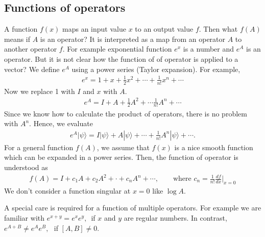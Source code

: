 \documentclass[letterpaper,10pt,english]{jupyterBook}
\begin{document}
\subsection{Functions of operators}
\label{\detokenize{qmsummary/operators:functions-of-operators}}
\sphinxAtStartPar
A function \(f(x)\) maps an input value \(x\) to an output value \(f\).  Then what \(f(A)\) means if \(A\) is an operator? It is interpreted as a map from an operator \(A\) to another operator \(f\).  For example exponential function \(e^x\) is a number and \(e^A\) is an operator. But it is not clear how the function of of operator is applied to a vector?  We define \(e^A\) using a power series (Taylor expansion).  For example,
\begin{equation*}
\begin{split}
e^x = 1 + x + \frac{1}{2}x^2 + \cdots + \frac{1}{n!}x^n + \cdots
\end{split}
\end{equation*}
\sphinxAtStartPar
Now we replace 1 with \(I\) and \(x\) with \(A\).
\begin{equation*}
\begin{split}
e^A = I + A + \frac{1}{2} A^2 + \cdots \frac{1}{n!} A^n + \cdots
\end{split}
\end{equation*}
\sphinxAtStartPar
Since we know how to calculate the product of operators, there is no problem with \(A^n\).  Hence, we evaluate
\begin{equation*}
\begin{split}
e^A |\psi\rangle = I |\psi\rangle + A |\psi\rangle + \cdots + \frac{1}{n!} A^n |\psi\rangle + \cdots.
\end{split}
\end{equation*}
\sphinxAtStartPar
For a general function \(f(A)\), we assume that \(f(x)\) is a nice smooth function which can be expanded in a power series.  Then, the function of operator is understood as
\begin{equation*}
\begin{split}
f(A) = I + c_1 A + c_2 A^2 + \cdot + c_n A^n + \cdots, \qquad \text{where  } c_n = \frac{1}{n!} \frac{d f}{dx} \Big|_{x=0}
\end{split}
\end{equation*}
\sphinxAtStartPar
We don’t consider a function singular at \(x=0\) like \(\log{A}\).

\sphinxAtStartPar
A special care is required for a function of multiple operators.  For example we are familiar with  \(e^{x+y} = e^x e^y,\,\) if \(x\) and \(y\) are regular numbers.  In contrast,  \(e^{A+B} \ne e^A e^B,\,\,\) if \([A,B]\ne 0\).
\end{document}
